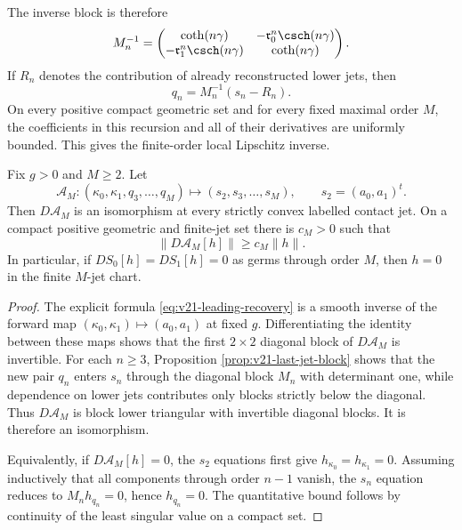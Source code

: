 The inverse block is therefore
\begin{equation}\label{eq:v21-general-recursion}
 M_n^{-1}=
 \begin{pmatrix}
 \coth(n\gamma)&-\mathfrak r_0^n\csch(n\gamma)\\
 -\mathfrak r_1^n\csch(n\gamma)&\coth(n\gamma)
 \end{pmatrix}.
\end{equation}
If $R_n$ denotes the contribution of already reconstructed lower jets, then
\begin{equation}\label{eq:v21-recursion}
                         q_n=M_n^{-1}(s_n-R_n).
\end{equation}
On every positive compact geometric set and for every fixed maximal order
$M$, the coefficients in this recursion and all of their derivatives are
uniformly bounded.  This gives the finite-order local Lipschitz inverse.

\begin{proposition}
\label{prop:v21-tangent-jet-isomorphism}
Fix $g>0$ and $M\ge2$.  Let
\[
 \mathscr A_M:
 (\kappa_0,\kappa_1,q_3,\ldots,q_M)
 \longmapsto (s_2,s_3,\ldots,s_M),
 \qquad s_2=(a_0,a_1)^t.
\]
Then $D\mathscr A_M$ is an isomorphism at every strictly convex labelled
contact jet.  On a compact positive geometric and finite-jet set there is
$c_M>0$ such that
\begin{equation}\label{eq:v21-tangent-lower-bound}
 \|D\mathscr A_M[h]\|\ge c_M\|h\|.
\end{equation}
In particular, if $D S_0[h]=D S_1[h]=0$ as germs through order $M$, then
$h=0$ in the finite $M$-jet chart.
\end{proposition}

\begin{proof}
The explicit formula \eqref{eq:v21-leading-recovery} is a smooth inverse of
the forward map
$(\kappa_0,\kappa_1)\mapsto(a_0,a_1)$ at fixed $g$.  Differentiating the
identity between these maps shows that the first $2\times2$ diagonal block
of $D\mathscr A_M$ is invertible.  For each $n\ge3$, Proposition
\ref{prop:v21-last-jet-block} shows that the new pair $q_n$ enters $s_n$
through the diagonal block $M_n$ with determinant one, while dependence on
lower jets contributes only blocks strictly below the diagonal.  Thus
$D\mathscr A_M$ is block lower triangular with invertible diagonal blocks.
It is therefore an isomorphism.

Equivalently, if $D\mathscr A_M[h]=0$, the $s_2$ equations first give
$h_{\kappa_0}=h_{\kappa_1}=0$.  Assuming inductively that all components
through order $n-1$ vanish, the $s_n$ equation reduces to
$M_nh_{q_n}=0$, hence $h_{q_n}=0$.  The quantitative bound follows by
continuity of the least singular value on a compact set.
\end{proof}

